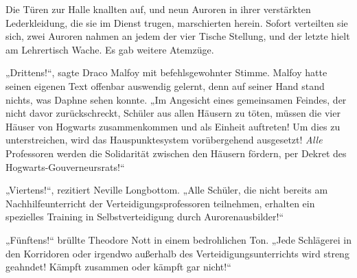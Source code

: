 Die Türen zur Halle knallten auf, und neun Auroren in ihrer verstärkten Lederkleidung, die sie im Dienst trugen, marschierten herein. Sofort verteilten sie sich, zwei Auroren nahmen an jedem der vier Tische Stellung, und der letzte hielt am Lehrertisch Wache. Es gab weitere Atemzüge.

„Drittens!“, sagte Draco Malfoy mit befehlsgewohnter Stimme. Malfoy hatte seinen eigenen Text offenbar auswendig gelernt, denn auf seiner Hand stand nichts, was Daphne sehen konnte. „Im Angesicht eines gemeinsamen Feindes, der nicht davor zurückschreckt, Schüler aus allen Häusern zu töten, müssen die vier Häuser von Hogwarts zusammenkommen und als Einheit auftreten! Um dies zu unterstreichen, wird das Hauspunktesystem vorübergehend ausgesetzt! \emph{Alle} Professoren werden die Solidarität zwischen den Häusern fördern, per Dekret des Hogwarts-Gouverneursrats!“

„Viertens!“, rezitiert Neville Longbottom. „Alle Schüler, die nicht bereits am Nachhilfeunterricht der Verteidigungsprofessoren teilnehmen, erhalten ein spezielles Training in Selbstverteidigung durch Aurorenausbilder!“

„Fünftens!“ brüllte Theodore Nott in einem bedrohlichen Ton. „Jede Schlägerei in den Korridoren oder irgendwo außerhalb des Verteidigungsunterrichts wird streng geahndet! Kämpft zusammen oder kämpft gar nicht!“

